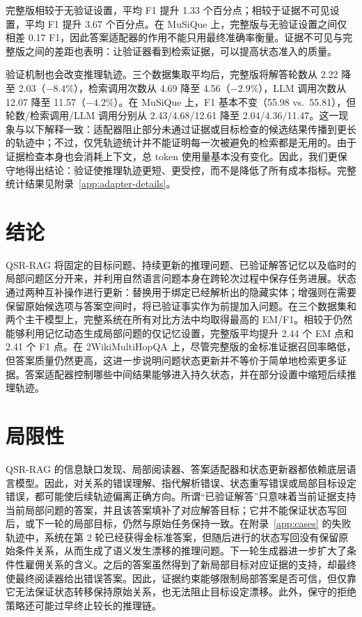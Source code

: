 \documentclass[11pt]{article}
\begin{document}
	完整版相较于无验证设置，平均 F1 提升 1.33 个百分点；相较于证据不可见设置，平均 F1 提升 3.67 个百分点。在 MuSiQue 上，完整版与无验证设置之间仅相差 0.17 F1，因此答案适配器的作用不能只用最终准确率衡量。证据不可见与完整版之间的差距也表明：让验证器看到检索证据，可以提高状态准入的质量。

	验证机制也会改变推理轨迹。三个数据集取平均后，完整版将解答轮数从 2.22 降至 2.03（$-8.4\%$），检索调用次数从 4.69 降至 4.56（$-2.9\%$），LLM 调用次数从 12.07 降至 11.57（$-4.2\%$）。在 MuSiQue 上，F1 基本不变（55.98 vs.\ 55.81），但轮数/检索调用/LLM 调用分别从 2.43/4.68/12.61 降至 2.04/4.36/11.47。这一现象与以下解释一致：适配器阻止部分未通过证据或目标检查的候选结果传播到更长的轨迹中；不过，仅凭轨迹统计并不能证明每一次被避免的检索都是无用的。由于证据检查本身也会消耗上下文，总 token 使用量基本没有变化。因此，我们更保守地得出结论：验证使推理轨迹更短、更受控，而不是降低了所有成本指标。完整统计结果见附录~\ref{app:adapter-details}。

	\section{结论}
	QSR-RAG 将固定的目标问题、持续更新的推理问题、已验证解答记忆以及临时的局部问题区分开来，并利用自然语言问题本身在跨轮次过程中保存任务进展。状态通过两种互补操作进行更新：替换用于绑定已经解析出的隐藏实体；增强则在需要保留原始候选项与答案空间时，将已验证事实作为前提加入问题。在三个数据集和两个主干模型上，完整系统在所有对比方法中均取得最高的 EM/F1。相较于仍然能够利用记忆动态生成局部问题的仅记忆设置，完整版平均提升 2.44 个 EM 点和 2.41 个 F1 点。在 2WikiMultiHopQA 上，尽管完整版的金标准证据召回率略低，但答案质量仍然更高，这进一步说明问题状态更新并不等价于简单地检索更多证据。答案适配器控制哪些中间结果能够进入持久状态，并在部分设置中缩短后续推理轨迹。

	\section{局限性}
	QSR-RAG 的信息缺口发现、局部阅读器、答案适配器和状态更新器都依赖底层语言模型。因此，对关系的错误理解、指代解析错误、状态重写错误或局部目标设定错误，都可能使后续轨迹偏离正确方向。所谓“已验证解答”只意味着当前证据支持当前局部问题的答案，并且该答案填补了对应解答目标；它并不能保证状态写回后，或下一轮的局部目标，仍然与原始任务保持一致。在附录~\ref{app:cases} 的失败轨迹中，系统在第 2 轮已经获得金标准答案，但随后进行的状态写回没有保留原始条件关系，从而生成了语义发生漂移的推理问题。下一轮生成器进一步扩大了条件性雇佣关系的含义。之后的答案虽然得到了新局部目标对应证据的支持，却最终使最终阅读器给出错误答案。因此，证据约束能够限制局部答案是否可信，但仅靠它无法保证状态转移保持原始关系，也无法阻止目标设定漂移。此外，保守的拒绝策略还可能过早终止较长的推理链。
\end{document}
